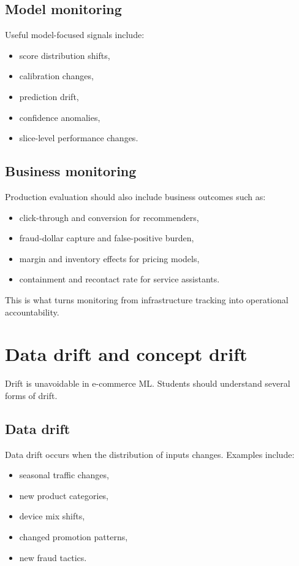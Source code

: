 \subsection{Model monitoring}
Useful model-focused signals include:
\begin{itemize}
  \item score distribution shifts,
  \item calibration changes,
  \item prediction drift,
  \item confidence anomalies,
  \item slice-level performance changes.
\end{itemize}

\subsection{Business monitoring}
Production evaluation should also include business outcomes such as:
\begin{itemize}
  \item click-through and conversion for recommenders,
  \item fraud-dollar capture and false-positive burden,
  \item margin and inventory effects for pricing models,
  \item containment and recontact rate for service assistants.
\end{itemize}

This is what turns monitoring from infrastructure tracking into operational accountability.

\section{Data drift and concept drift}
Drift is unavoidable in e-commerce ML.
Students should understand several forms of drift.

\subsection{Data drift}
Data drift occurs when the distribution of inputs changes.
Examples include:
\begin{itemize}
  \item seasonal traffic changes,
  \item new product categories,
  \item device mix shifts,
  \item changed promotion patterns,
  \item new fraud tactics.
\end{itemize}

